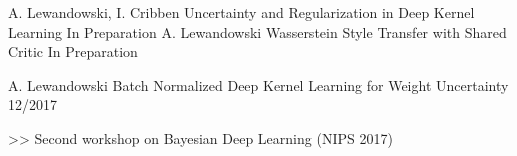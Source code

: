 \begin{cventries}
    \cventry
    {A. Lewandowski, I. Cribben}
    {Uncertainty and Regularization in Deep Kernel Learning}
    {In Preparation}
    {
    }
    \cventry
    {A. Lewandowski}
    {Wasserstein Style Transfer with Shared Critic}
    {In Preparation}
    {
    }

  \cventry
    {A. Lewandowski}
    {Batch Normalized Deep Kernel Learning for Weight
Uncertainty}
    {12/2017}
    {
      \begin{cvitems}
    	\item[>>] Second workshop on Bayesian Deep Learning (NIPS 2017)
      \end{cvitems}
    }
  \end{cventries}

% 
% 
